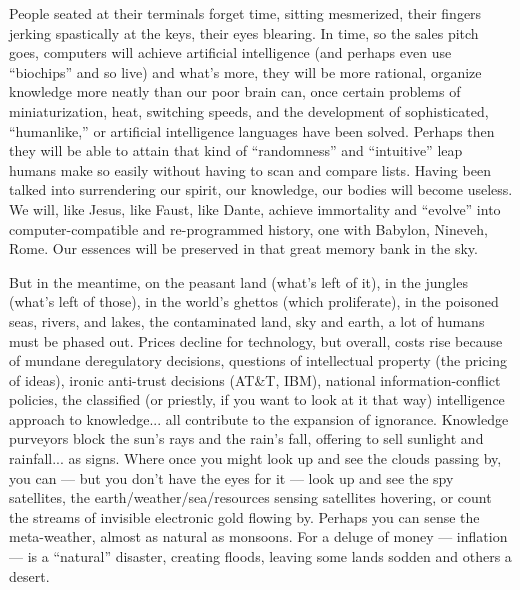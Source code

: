 People seated at their terminals forget time, sitting mesmerized, their fingers jerking spastically
at the keys, their eyes blearing. In time, so the sales pitch goes, computers will achieve
artificial intelligence (and perhaps even use \enquote{biochips} and so live) and what's more, they
will be more rational, organize knowledge more neatly than our poor brain can, once certain problems
of miniaturization, heat, switching speeds, and the development of sophisticated,
\enquote{humanlike,} or artificial intelligence languages have been solved. Perhaps then they will
be able to attain that kind of \enquote{randomness} and \enquote{intuitive} leap humans make so
easily without having to scan and compare lists. Having been talked into surrendering our spirit,
our knowledge, our bodies will become useless. We will, like Jesus, like Faust, like Dante, achieve
immortality and \enquote{evolve} into computer-compatible and re-programmed history, one with
Babylon, Nineveh, Rome. Our essences will be preserved in that great memory bank in the sky. 

But in the meantime, on the peasant land (what's left of it), in the jungles (what's left of those),
in the world's ghettos (which proliferate), in the poisoned seas, rivers, and lakes, the
contaminated land, sky and earth, a lot of humans must be phased out. Prices decline for technology,
but overall, costs rise because of mundane deregulatory decisions, questions of intellectual
property (the pricing of ideas), ironic anti-trust decisions (AT\&T, IBM), national
information-conflict policies, the classified (or priestly, if you want to look at it that way)
intelligence approach to knowledge... all contribute to the expansion of ignorance. Knowledge
purveyors block the sun's rays and the rain's fall, offering to sell sunlight and rainfall... as
signs. Where once you might look up and see the clouds passing by, you can --- but you don't have
the eyes for it --- look up and see the spy satellites, the earth/weather/sea/resources sensing
satellites hovering, or count the streams of invisible electronic gold flowing by. Perhaps you can
sense the meta-weather, almost as natural as monsoons. For a deluge of money --- inflation --- is a
\enquote{natural} disaster, creating floods, leaving some lands sodden and others a desert. 
